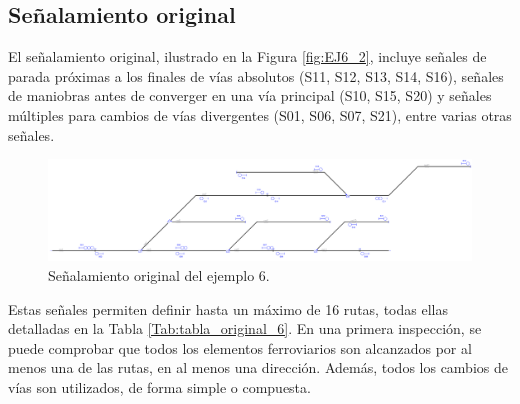 \subsection{Señalamiento original}

    El señalamiento original, ilustrado en la Figura \ref{fig:EJ6_2}, incluye señales de parada próximas a los finales de vías absolutos (S11, S12, S13, S14, S16), señales de maniobras antes de converger en una vía principal (S10, S15, S20) y señales múltiples para cambios de vías divergentes (S01, S06, S07, S21), entre varias otras señales.
    
    \begin{figure}[H]
    	\centering
    	\includegraphics[width=1\textwidth]{resultados-obtenidos/ejemplo6/images/6_original.png}
    	\centering\caption{Señalamiento original del ejemplo 6.}
    	\label{fig:EJ1_2}
    \end{figure}
    
    Estas señales permiten definir hasta un máximo de 16 rutas, todas ellas detalladas en la Tabla \ref{Tab:tabla_original_6}. En una primera inspección, se puede comprobar que todos los elementos ferroviarios son alcanzados por al menos una de las rutas, en al menos una dirección. Además, todos los cambios de vías son utilizados, de forma simple o compuesta. 
    
